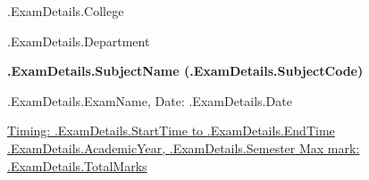 \documentclass[12pt, a4paper]{exam}
\begin{document}

\begin{minipage}[c]{0.8\textwidth}
	\begin{center}
		{\large	{{.ExamDetails.College}} \par
		\large	{{.ExamDetails.Department}}	\par
	\large \textbf{ {{.ExamDetails.SubjectName}} ({{.ExamDetails.SubjectCode}})}	\par
\small	{{.ExamDetails.ExamName}}, Date: {{.ExamDetails.Date}}}
	\end{center}
\end{minipage}
\par
\vspace{0.2in}
\noindent
\uline{Timing: {{.ExamDetails.StartTime}} to {{.ExamDetails.EndTime}}	\hfill {{.ExamDetails.AcademicYear}}, {{.ExamDetails.Semester}}		\hfill Max mark: {{.ExamDetails.TotalMarks}}}
\par 
\vspace{0.15in}
\end{document}
